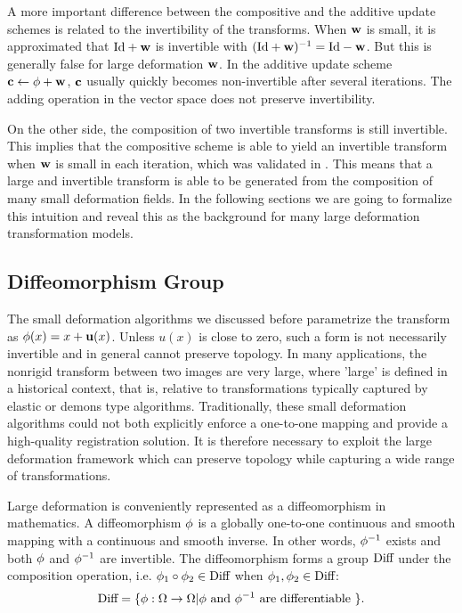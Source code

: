 \documentclass[letterpaper,12pt]{article}
\begin{document}
A more important difference between the compositive and the additive update schemes is related to the invertibility of the transforms. 
When $\mathbf{w}$ is small, it is approximated that $\text{Id}+\mathbf{w}$ is invertible
with $(\text{Id}+\mathbf{w})^{-1}=\text{Id}-\mathbf{w}$. But this is generally false for large deformation $\mathbf{w}$. 
In the additive update scheme $\mathbf{c} \leftarrow \phi + \mathbf{w}$, $\mathbf{c}$ usually quickly becomes non-invertible after several iterations. The adding operation in the vector space does not preserve invertibility. 

On the other side, the composition of two invertible transforms is still invertible. 
This implies that the compositive scheme is able to yield an invertible transform when $\mathbf{w}$ is small in each iteration, which was validated in \cite{Vercauteren2009}. 
This means that a large and invertible transform is able to be generated from the composition of many small deformation fields. In the following sections we are going to formalize this intuition and
reveal this as the background for many large deformation transformation models.

\subsection{Diffeomorphism Group}
\label{sec:diffgroup}

The small deformation algorithms we discussed before parametrize the
transform as $\phi(x) = x + \mathbf{u}(x)$. Unless $u(x)$ is close to
zero, such a form is not necessarily invertible and in general cannot
preserve topology. In many applications, the nonrigid transform
between two images are very large, where 'large' is defined in a
historical context, that is, relative to transformations typically
captured by elastic or demons type algorithms. Traditionally, these
small deformation algorithms could not both explicitly enforce a
one-to-one mapping and provide a high-quality registration
solution. It is therefore necessary to exploit the large deformation
framework which can preserve topology while capturing a wide range of transformations.

Large deformation is conveniently represented as a diffeomorphism in
mathematics. A diffeomorphism $\phi$ is a globally one-to-one
continuous and smooth mapping with a continuous and smooth inverse. In other words, $\phi^{-1}$ exists and both $\phi$ and $\phi^{-1}$ are invertible. The diffeomorphism forms a group $\text{Diff}$ under the composition operation, i.e. $\phi_1 \circ \phi_2 \in \text{Diff}$ when $\phi_1, \phi_2 \in \text{Diff}$:
\begin{align}
\text{Diff} = \{ \phi: \Omega \to \Omega | \phi \text{ and } \phi^{-1} \text{ are differentiable }\}.
\end{align}
\end{document}
